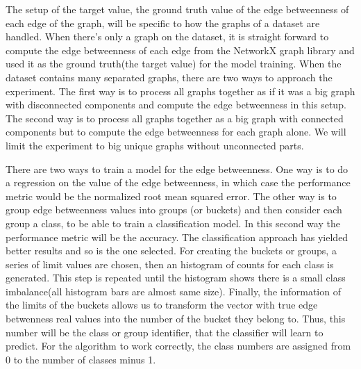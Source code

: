 The setup of the target value, the ground truth value of the edge betweenness of each edge of the graph, will be specific to how the graphs of a dataset are handled. When there's only a graph on the dataset, it is straight forward to compute the edge betweenness of each edge from the NetworkX graph library and used it as the ground truth(the target value) for the model training. When the dataset contains many separated graphs, there are two ways to approach the experiment. The first way is to process all graphs together as if it was a big graph with disconnected components and compute the edge betweenness in this setup. The second way is to process all graphs together as a big graph with connected components but to compute the edge betweenness for each graph alone. We will limit the experiment to big unique graphs without unconnected parts.


There are two ways to train a model for the edge betweenness. One way is to do a regression on the value of the edge betweenness, in which case the performance metric would be the normalized root mean squared error. The other way is to group edge betweenness values into groups (or buckets) and then consider each group a class, to be able to train a classification model. In this second way the performance metric will be the accuracy. The classification approach has yielded better results and so is the one selected. For creating the buckets or groups, a series of limit values are chosen, then an histogram of counts for each class is generated. This step is repeated until the histogram shows there is a small class imbalance(all histogram bars are almost same size). Finally, the information of the limits of the buckets allows us to transform the vector with true edge betwenness real values into the number of the bucket they belong to. Thus, this number will be the class or group identifier, that the classifier will learn to predict. For the algorithm to work correctly, the class numbers are assigned from 0 to the number of classes minus 1.




